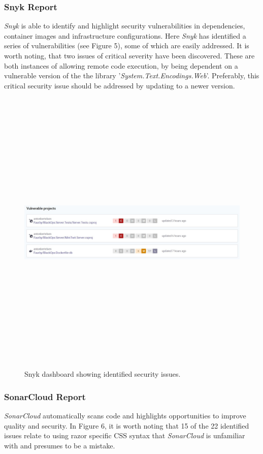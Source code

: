 \subsubsection{Snyk Report}
\textit{Snyk} is able to identify and highlight security vulnerabilities in dependencies, container images and infrastructure configurations. Here \textit{Snyk} has identified a series of vulnerabilities (see Figure 5), some of which are easily addressed. It is worth noting, that two issues of critical severity have been discovered. These are both instances of allowing remote code execution, by being dependent on a vulnerable version of the the library '\textit{System.Text.Encodings.Web}'. Preferably, this critical security issue should be addressed by updating to a newer version. 

\begin{figure}[H]
    \centering
    \includegraphics[width=16cm,height=14cm,keepaspectratio]{images/snyk.jpg}
    \caption{Snyk dashboard showing identified security issues.}
    \label{ComponentDiagram_1}
\end{figure}

\subsubsection{SonarCloud Report}
\textit{SonarCloud} automatically scans code and highlights opportunities to improve quality and security. In Figure 6, it is worth noting that 15 of the 22 identified issues relate to using razor specific CSS syntax that \textit{SonarCloud} is unfamiliar with and presumes to be a mistake.

